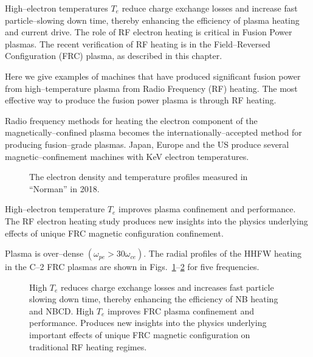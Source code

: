 \documentclass[a4paper,openany,12pt]{book}
\begin{document}
High--electron temperatures $T_e$ reduce charge exchange losses and increase fast particle--slowing down time, thereby enhancing the efficiency of plasma heating and current drive. The role of RF electron heating is critical in Fusion Power plasmas. The recent verification of RF heating is in the Field--Reversed Configuration (FRC) plasma, as described in this chapter.

Here we give examples of machines that have produced significant fusion power from high--temperature plasma from Radio Frequency (RF) heating. The most effective way to produce the fusion power plasma is through RF heating.

Radio frequency methods for heating the electron component of the magnetically--confined plasma becomes the internationally--accepted method for producing fusion--grade plasmas. Japan, Europe and the US produce several magnetic--confinement machines with KeV electron temperatures.
%
\begin{figure}[H]
\centerline{}
\caption{The electron density and temperature profiles measured in ``Norman'' in 2018.}
\label{F3.2}
\end{figure}
%
%
High--electron temperature $T_e$ improves plasma confinement and performance. The RF electron heating study produces new insights into the physics underlying effects of unique FRC magnetic configuration confinement.

Plasma is over--dense $(\omega_{pe}>30\omega_{ce})$. The radial profiles of the HHFW heating in the C--2 FRC plasmas are shown in Figs.~\ref{F3.2}--\ref{F3.3} for five frequencies.
%
\begin{figure}[H]
\centerline{}
\caption{High $T_e$ reduces charge exchange losses and increases fast particle slowing down time, thereby enhancing the efficiency of NB heating and NBCD. High $T_e$ improves FRC plasma confinement and performance. Produces new insights into the physics underlying important effects of unique FRC magnetic configuration on traditional RF heating regimes.}
\label{F3.3}
\end{figure}
%
\end{document}
